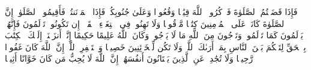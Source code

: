\stopbuffer%
\startbuffer[\q:4:103]
فَإِذَا قَضَیۡتُمُ ٱلصَّلَوٰةَ فَٱذۡكُرُوا۟ ٱللَّهَ قِیَٰمࣰا وَقُعُودࣰا وَعَلَىٰ جُنُوبِكُمۡۚ فَإِذَا ٱطۡمَأۡنَنتُمۡ فَأَقِیمُوا۟ ٱلصَّلَوٰةَۚ إِنَّ ٱلصَّلَوٰةَ كَانَتۡ عَلَى ٱلۡمُؤۡمِنِینَ كِتَٰبࣰا مَّوۡقُوتࣰا%
\stopbuffer%
\startbuffer[\q:4:104]
وَلَا تَهِنُوا۟ فِی ٱبۡتِغَاۤءِ ٱلۡقَوۡمِۖ إِن تَكُونُوا۟ تَأۡلَمُونَ فَإِنَّهُمۡ یَأۡلَمُونَ كَمَا تَأۡلَمُونَۖ وَتَرۡجُونَ مِنَ ٱللَّهِ مَا لَا یَرۡجُونَۗ وَكَانَ ٱللَّهُ عَلِیمًا حَكِیمًا%
\stopbuffer%
\startbuffer[\q:4:105]
إِنَّاۤ أَنزَلۡنَاۤ إِلَیۡكَ ٱلۡكِتَٰبَ بِٱلۡحَقِّ لِتَحۡكُمَ بَیۡنَ ٱلنَّاسِ بِمَاۤ أَرَىٰكَ ٱللَّهُۚ وَلَا تَكُن لِّلۡخَاۤئِنِینَ خَصِیمࣰا%
\stopbuffer%
\startbuffer[\q:4:106]
وَٱسۡتَغۡفِرِ ٱللَّهَۖ إِنَّ ٱللَّهَ كَانَ غَفُورࣰا رَّحِیمࣰا%
\stopbuffer%
\startbuffer[\q:4:107]
وَلَا تُجَٰدِلۡ عَنِ ٱلَّذِینَ یَخۡتَانُونَ أَنفُسَهُمۡۚ إِنَّ ٱللَّهَ لَا یُحِبُّ مَن كَانَ خَوَّانًا أَثِیمࣰا%
\stopbuffer%

